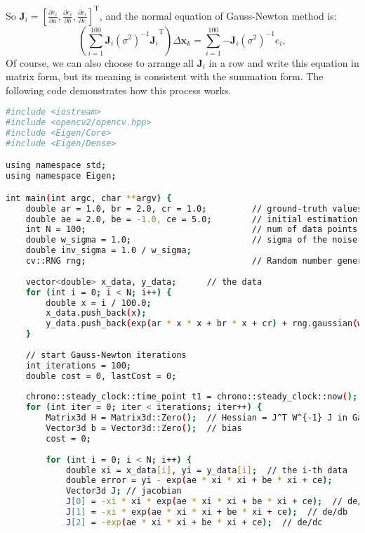 So $\mathbf{J}_i = \left[\frac{{\partial {e_i}}}{{\partial a}},\frac{{\partial {e_i}}}{{\partial b}},\frac{{\partial {e_i}}}{{\partial c}} \right]^\mathrm{T}$, and the normal equation of Gauss-Newton method is:
\begin{equation}
    \left(\sum\limits_{i = 1}^{100} {\mathbf{J}_i{(\sigma^2)^{ - 1}}{\mathbf{J}_i}}^\mathrm{T} \right) \Delta \mathbf{x}_k = \sum\limits_{i = 1}^{100} { - {\mathbf{J}_i}{(\sigma^2)^{ - 1}}{e_i}},
\end{equation}
Of course, we can also choose to arrange all $\mathbf{J}_i$ in a row and write this equation in matrix form, but its meaning is consistent with the summation form. The following code demonstrates how this process works.

\begin{lstlisting}[language=sh,caption=slambook2/ch6/gaussNewton.cpp]
#include <iostream>
#include <opencv2/opencv.hpp>
#include <Eigen/Core>
#include <Eigen/Dense>

using namespace std;
using namespace Eigen;

int main(int argc, char **argv) {
    double ar = 1.0, br = 2.0, cr = 1.0;         // ground-truth values
    double ae = 2.0, be = -1.0, ce = 5.0;        // initial estimation
    int N = 100;                                 // num of data points
    double w_sigma = 1.0;                        // sigma of the noise
    double inv_sigma = 1.0 / w_sigma;
    cv::RNG rng;                                 // Random number generator 
    
    vector<double> x_data, y_data;      // the data
    for (int i = 0; i < N; i++) {
        double x = i / 100.0;
        x_data.push_back(x);
        y_data.push_back(exp(ar * x * x + br * x + cr) + rng.gaussian(w_sigma * w_sigma));
    }
    
    // start Gauss-Newton iterations
    int iterations = 100;   
    double cost = 0, lastCost = 0;  
    
    chrono::steady_clock::time_point t1 = chrono::steady_clock::now();
    for (int iter = 0; iter < iterations; iter++) {            
        Matrix3d H = Matrix3d::Zero();  // Hessian = J^T W^{-1} J in Gauss-Newton
        Vector3d b = Vector3d::Zero();  // bias
        cost = 0;
        
        for (int i = 0; i < N; i++) {
            double xi = x_data[i], yi = y_data[i];  // the i-th data
            double error = yi - exp(ae * xi * xi + be * xi + ce);
            Vector3d J; // jacobian
            J[0] = -xi * xi * exp(ae * xi * xi + be * xi + ce);  // de/da
            J[1] = -xi * exp(ae * xi * xi + be * xi + ce);  // de/db
            J[2] = -exp(ae * xi * xi + be * xi + ce);  // de/dc
            

\end{lstlisting}
